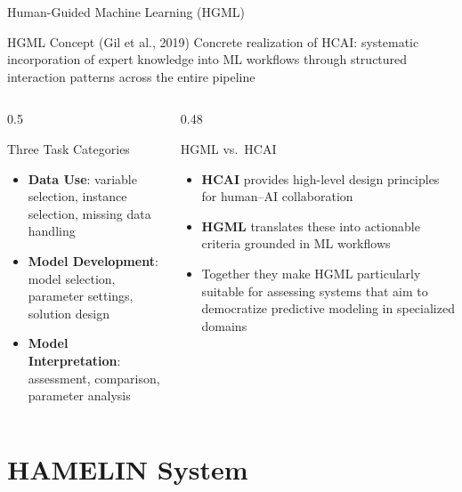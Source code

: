 \documentclass[aspectratio=169,10pt,english,dvipsnames]{beamer}
\begin{document}
\begin{frame}{Human-Guided Machine Learning (HGML)}
  \begin{block}{HGML Concept \normalfont\small (Gil et al., 2019)}
    Concrete realization of HCAI: systematic incorporation of expert knowledge into ML
    workflows through structured interaction patterns across the entire pipeline
  \end{block}
  \vspace{3mm}

  \begin{columns}[T]
    \begin{column}{0.5\textwidth}
      \begin{block}{Three Task Categories}
        \begin{itemize}\scriptsize
          \item \textbf{Data Use}: variable selection, instance selection, missing data handling
          \item \textbf{Model Development}: model selection, parameter settings, solution design
          \item \textbf{Model Interpretation}: assessment, comparison, parameter analysis
        \end{itemize}
      \end{block}
    \end{column}
    \begin{column}{0.48\textwidth}
      \begin{block}{HGML vs.\ HCAI}
        \begin{itemize}\scriptsize
          \item \textbf{HCAI} provides high-level design principles for human--AI collaboration
          \item \textbf{HGML} translates these into actionable criteria grounded in ML workflows
          \item Together they make HGML particularly suitable for assessing systems that aim to democratize predictive modeling in specialized domains
        \end{itemize}
      \end{block}
    \end{column}
  \end{columns}
\end{frame}

\section{HAMELIN System}
\end{document}
